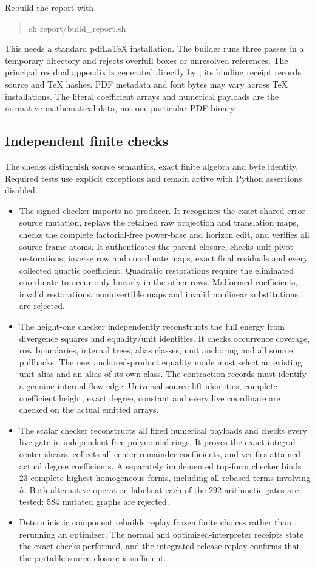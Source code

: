 Rebuild the report with
\begin{quote}\ttfamily
sh report/build\_report.sh
\end{quote}
This needs a standard pdfLaTeX installation. The builder runs three passes
in a temporary directory and rejects overfull boxes or unresolved references.
The principal residual appendix is generated directly by
; its binding receipt records source and
TeX hashes. PDF metadata and font bytes may vary across TeX installations.
The literal coefficient arrays and numerical payloads are the normative
mathematical data, not one particular PDF binary.

\subsection{Independent finite checks}
The checks distinguish source semantics, exact finite algebra and byte
identity. Required tests use explicit exceptions and remain active with
Python assertions disabled.
\begin{itemize}
\item The signed checker imports no producer. It recognizes the exact
shared-error source mutation, replays the retained raw projection and
translation maps, checks the complete factorial-free power-base and
horizon edit, and verifies all source-frame atoms. It authenticates the
parent closure, checks unit-pivot restorations, inverse row and coordinate
maps, exact final residuals and every collected quartic coefficient.
Quadratic restorations require the eliminated coordinate to occur only
linearly in the other rows. Malformed coefficients, invalid restorations,
noninvertible maps and invalid nonlinear substitutions are rejected.
\item The height-one checker independently reconstructs the full energy
from divergence squares and equality/unit identities. It checks occurrence
coverage, row boundaries, internal trees, alias classes, unit anchoring and
all source pullbacks. The new anchored-product equality mode must select
an existing unit alias and an alias of its own class. The contraction
records must identify a genuine internal flow edge. Universal source-lift
identities, complete coefficient height, exact degree, constant and every
live coordinate are checked on the actual emitted arrays.
\item The scalar checker reconstructs all fixed numerical payloads and
checks every live gate in independent free polynomial rings. It proves the
exact integral center shears, collects all center-remainder coefficients,
and verifies attained actual degree coefficients. A separately implemented
top-form checker binds 23 complete highest homogeneous forms, including
all rebased terms involving $h$. Both alternative operation labels at each
of the 292 arithmetic gates are tested: 584 mutated graphs are rejected.
\item Deterministic component rebuilds replay frozen finite choices rather
than rerunning an optimizer. The normal and optimized-interpreter receipts
state the exact checks performed, and the integrated release replay
confirms that the portable source closure is sufficient.
\end{itemize}
